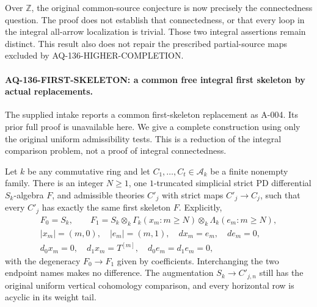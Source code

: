 Over $\mathbb Z$, the original common-source conjecture is
now precisely the connectedness question. The proof does
not establish that connectedness, or that every loop in
the integral all-arrow localization is trivial. Those two
integral assertions remain distinct. This result also does
not repair the prescribed partial-source maps excluded by
AQ-136-HIGHER-COMPLETION.


\paragraph{AQ-136-FIRST-SKELETON: a common free integral first skeleton by actual replacements.}
The supplied intake reports a common first-skeleton replacement
as A-004. Its prior full proof is unavailable here. We give a
complete construction using only the original uniform
admissibility tests. This is a reduction of the integral
comparison problem, not a proof of integral connectedness.

Let $k$ be any commutative ring and let
$C_1,\ldots,C_t\in\mathcal A_k$ be a finite nonempty family.
There is an integer $N\ge1$, one $1$-truncated simplicial strict
PD differential $S_k$-algebra $F$, and admissible theories
$C'_j$ with strict maps $C'_j\to C_j$, such that every $C'_j$
has exactly the same first skeleton $F$. Explicitly,
\[
 \begin{gathered}
 F_0=S_k,\qquad
 F_1=S_k\otimes_k
       \Gamma_k(x_m:m\ge N)\otimes_k\Lambda_k(e_m:m\ge N),\\
 |x_m|=(m,0),\quad |e_m|=(m,1),\quad dx_m=e_m,\quad de_m=0,\\
 d_0x_m=0,\quad d_1x_m=T^{[m]},\quad
 d_0e_m=d_1e_m=0,
 \end{gathered}                                             \tag{136.SK1}
\]
with the degeneracy $F_0\to F_1$ given by coefficients.
Interchanging the two endpoint names makes no difference.
The augmentation $S_k\to C'_{j,n}$ still has the original
uniform vertical cohomology comparison, and every horizontal
row is acyclic in its weight tail.

